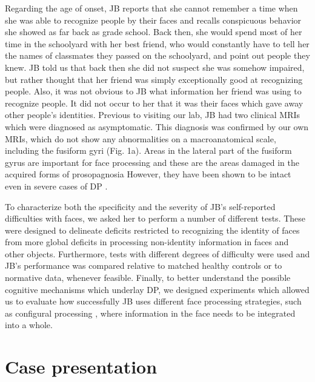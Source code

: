 \documentclass[fleqn,10pt]{SelfArx} %
\begin{document}
Regarding the age of onset, JB reports that she cannot remember a time when she was able to recognize people by their faces and recalls conspicuous behavior she showed as far back as grade school. Back then, she would spend most of her time in the schoolyard with her best friend, who would constantly have to tell her the names of classmates they passed on the schoolyard, and point out people they knew. JB told us that back then she did not suspect she was somehow impaired, but rather thought that her friend was simply exceptionally good at recognizing people. Also, it was not obvious to JB what information her friend was using to recognize people. It did not occur to her that it was their faces which gave away other people's identities.
Previous to visiting our lab, JB had two clinical MRIs which were diagnosed as asymptomatic. This diagnosis was confirmed by our own MRIs, which do not show any abnormalities on a macroanatomical scale, including the fusiform gyri (Fig. 1a). Areas in the lateral part of the fusiform gyrus are important for face processing \citep{Grill_Spector_2014} and these are the areas damaged in the acquired forms of prosopagnosia \citep{Damasio_1982} However, they have been shown to be intact even in severe cases of DP \citep{De_Haan_1991, de_Gelder_2000, Nunn_2001, Jones_2001}.

To characterize both the specificity and the severity of JB's self-reported difficulties with faces, we asked her to perform a number of different tests. These were designed to delineate deficits restricted to recognizing the identity of faces from more global deficits in processing non-identity information in faces and other objects. Furthermore, tests with different degrees of difficulty were used and JB's performance was compared relative to matched healthy controls or to normative data, whenever feasible. Finally, to better understand the possible cognitive mechanisms which underlay DP, we designed experiments which allowed us to evaluate how successfully JB uses different face processing strategies, such as configural processing \citep{Maurer_2002}, where information in the face needs to be integrated into a whole.

\section{Case presentation}
\end{document}
